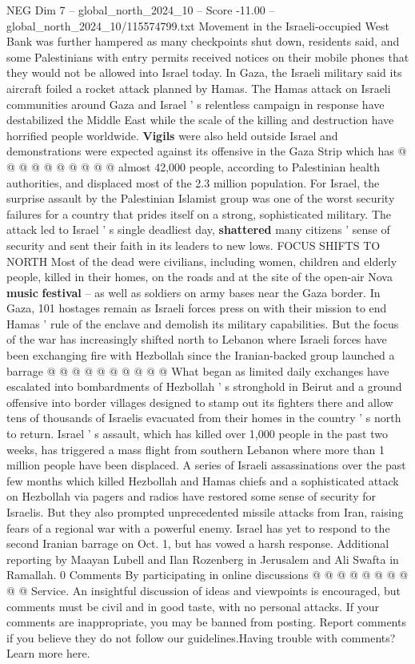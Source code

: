 \begin{textsample}{NEG Dim 7 – global\_north\_2024\_10 – Score -11.00 – global\_north\_2024\_10/115574799.txt}
Movement in the Israeli-occupied West Bank was further hampered as many checkpoints shut down, residents said, and some Palestinians with entry permits received notices on their mobile phones that they would not be allowed into Israel today.
In Gaza, the Israeli military said its aircraft foiled a rocket attack planned by Hamas.
The Hamas attack on Israeli communities around Gaza and Israel ' s relentless campaign in response have destabilized the Middle East while the scale of the killing and destruction have horrified people worldwide. \textbf{Vigils} were also held outside Israel and demonstrations were expected against its offensive in the Gaza Strip which has @ @ @ @ @ @ @ @ @ @ almost 42,000 people, according to Palestinian health authorities, and displaced most of the 2.3 million population.
For Israel, the surprise assault by the Palestinian Islamist group was one of the worst security failures for a country that prides itself on a strong, sophisticated military.
The attack led to Israel ' s single deadliest day, \textbf{shattered} many citizens ' sense of security and sent their faith in its leaders to new lows.
FOCUS SHIFTS TO NORTH Most of the dead were civilians, including women, children and elderly people, killed in their homes, on the roads and at the site of the open-air Nova \textbf{music} \textbf{festival} -- as well as soldiers on army bases near the Gaza border.
In Gaza, 101 hostages remain as Israeli forces press on with their mission to end Hamas ' rule of the enclave and demolish its military capabilities.
But the focus of the war has increasingly shifted north to Lebanon where Israeli forces have been exchanging fire with Hezbollah since the Iranian-backed group launched a barrage @ @ @ @ @ @ @ @ @ @ What began as limited daily exchanges have escalated into bombardments of Hezbollah ' s stronghold in Beirut and a ground offensive into border villages designed to stamp out its fighters there and allow tens of thousands of Israelis evacuated from their homes in the country ' s north to return.
Israel ' s assault, which has killed over 1,000 people in the past two weeks, has triggered a mass flight from southern Lebanon where more than 1 million people have been displaced.
A series of Israeli assassinations over the past few months which killed Hezbollah and Hamas chiefs and a sophisticated attack on Hezbollah via pagers and radios have restored some sense of security for Israelis.
But they also prompted unprecedented missile attacks from Iran, raising fears of a regional war with a powerful enemy.
Israel has yet to respond to the second Iranian barrage on Oct. 1, but has vowed a harsh response.
Additional reporting by Maayan Lubell and Ilan Rozenberg in Jerusalem and Ali Swafta in Ramallah. 0 Comments By participating in online discussions @ @ @ @ @ @ @ @ @ @ Service.
An insightful discussion of ideas and viewpoints is encouraged, but comments must be civil and in good taste, with no personal attacks.
If your comments are inappropriate, you may be banned from posting.
Report comments if you believe they do not follow our guidelines.Having trouble with comments?
Learn more here.


\end{textsample}
